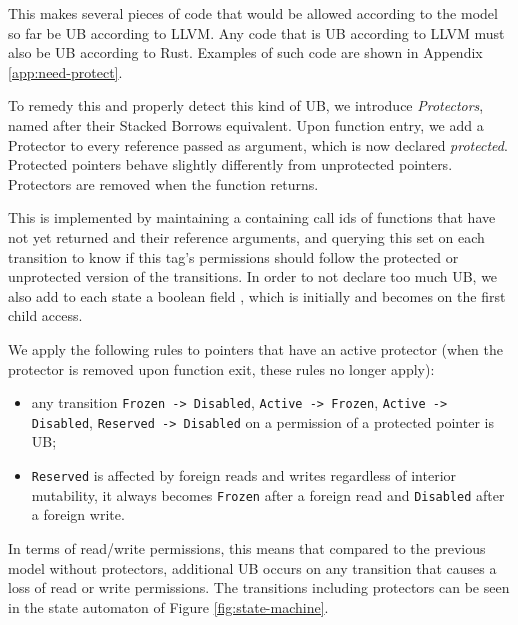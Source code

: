 \documentclass[a4paper,11pt]{article}
\theoremstyle{plain}
\theoremstyle{definition}
\theoremstyle{remark}
\newcommand{\tcode}[1]{\rstinline{#1}}
\newcommand{\tperm}[1]{\texttt{#1}}
\begin{document}
This makes several pieces of code that would be allowed according to the model so
far be UB according to LLVM. Any code that is UB according to LLVM must also be
UB according to Rust. Examples of such code are shown in Appendix \ref{app:need-protect}.

To remedy this and properly detect this kind of UB, we introduce \textit{Protectors},
named after their Stacked Borrows equivalent.
Upon function entry, we add a Protector to every reference passed as argument, which
is now declared \textit{protected}. Protected pointers behave slightly differently from
unprotected pointers. Protectors are removed when the function returns.

This is implemented by maintaining a \tcode{HashSet} containing call ids of functions that have not yet
returned and their reference arguments, and querying this set on each transition
to know if this tag's permissions should follow the protected or unprotected
version of the transitions. In order to not declare too much UB, we also add
to each state a boolean field \tcode{accessed}, which is initially \tcode{false}
and becomes \tcode{true} on the first child access.

We apply the following rules to pointers that have an active protector
(when the protector is removed upon function exit, these rules no longer apply):

\begin{itemize}
    \item any transition \tperm{Frozen -> Disabled}, \tperm{Active -> Frozen},
        \tperm{Active -> Disabled}, \tperm{Reserved -> Disabled} on a permission of a protected
        pointer is UB;
    \item \tperm{Reserved} is affected by foreign reads and writes regardless of interior mutability,
        it always becomes \tperm{Frozen} after a foreign read and \tperm{Disabled} after a foreign write.
\end{itemize}

In terms of read/write permissions, this means that compared to the previous
model without protectors, additional UB occurs on any transition that causes
a loss of read or write permissions.
The transitions including protectors can be seen in the state automaton of Figure \ref{fig:state-machine}.
\end{document}

